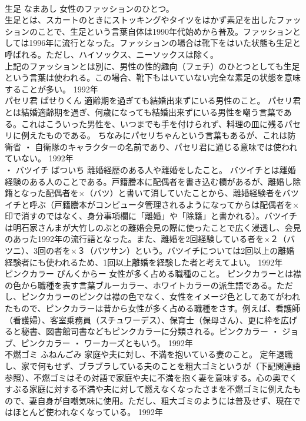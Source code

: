 \documentclass[8pt]{extreport}
\begin{document}
\begin{CJK}{UTF8}{min}
\\	生足	なまあし	女性のファッションのひとつ。	
\\	生足とは、スカートのときにストッキングやタイツをはかず素足を出したファッションのことで、生足という言葉自体は1990年代始めから普及。ファッションとしては1996年に流行となった。ファッションの場合は靴下をはいた状態も生足と呼ばれる。ただし、ハイソックス、ニーソックスは除く。 
\\	上記のファッションとは別に、男性の性的趣向（フェチ）のひとつとしても生足という言葉は使われる。この場合、靴下もはいていない完全な素足の状態を意味することが多い。	1992年	
\\	パセリ君	ぱせりくん	適齢期を過ぎても結婚出来ずにいる男性のこと。	パセリ君とは結婚適齢期を過ぎ、何歳になっても結婚出来ずにいる男性を嘲う言葉である。これはこういった男性を、いつまでも手を付けられず、料理の皿に残るパセリに例えたものである。 ちなみにパセリちゃんという言葉もあるが、これは防衛省 ・ 自衛隊のキャラクターの名前であり、パセリ君に通じる意味では使われていない。	1992年	
\\	・ バツイチ	ばついち	離婚経歴のある人や離婚をしたこと。	バツイチとは離婚経験のある人のことである。戸籍謄本に配偶者を書き込む欄があるが、離婚し除籍となった配偶者を×（バツ）と書いて消していたことから、離婚経験者をバツイチと呼ぶ（戸籍謄本がコンピュータ管理されるようになってからは配偶者を×印で消すのではなく、身分事項欄に「離婚」や「除籍」と書かれる）。バツイチは明石家さんまが大竹しのぶとの離婚会見の際に使ったことで広く浸透し、会見のあった1992年の流行語となった。また、離婚を2回経験している者を×２（バツニ）、3回の者を×３（バツサン）という。バツイチについては2回以上の離婚経験者にも使われるため、1回以上離婚を経験した者と考えてよい。	1992年	
\\	ピンクカラー	ぴんくからー	女性が多く占める職種のこと。	ピンクカラーとは襟
\\	の色から職種を表す言葉ブルーカラー、ホワイトカラーの派生語である。ただし、ピンクカラーのピンクは襟の色でなく、女性をイメージ色としてあてがわれたもので、ピンクカラーは昔から女性が多く占める職種をさす。例えば、看護師（看護婦）、客室乗務員（スチュワーデス）、保育士（保母さん）、更に枠を広げると秘書、図書館司書などもピンクカラーに分類される。ピンクカラー ・ ジョブ、ピンクカラー ・ ワーカーズともいう。	1992年	
\\	不燃ゴミ	ふねんごみ	家庭や夫に対し、不満を抱いている妻のこと。	定年退職し、家で何もせず、ブラブラしている夫のことを粗大ゴミというが（下記関連語参照）、不燃ゴミはその対語で家庭や夫に不満を抱く妻を意味する。心の奥でくすぶる家庭に対する不満や夫に対して燃えなくなったさまを不燃ゴミに例えたもので、妻自身が自嘲気味に使用。ただし、粗大ゴミのようには普及せず、現在ではほとんど使われなくなっている。	1992年	

\end{CJK}
\end{document}
